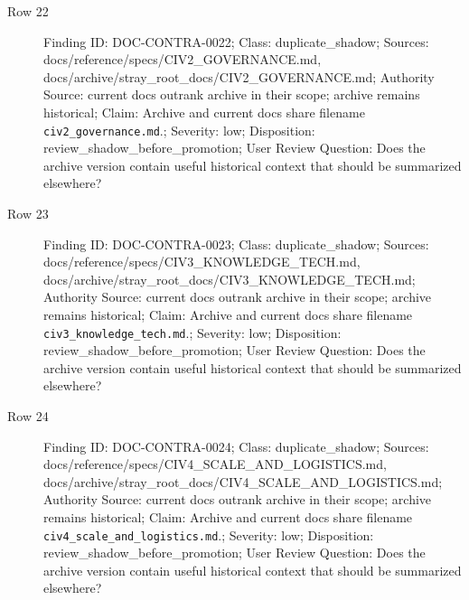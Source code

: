 \documentclass[10.5pt,a4paper,openany]{book}
\begin{document}
\begin{description}
\item[Row 22] Finding ID: DOC-\allowbreak{}CONTRA-\allowbreak{}0022; Class: duplicate\_\allowbreak{}shadow; Sources: docs/\allowbreak{}reference/\allowbreak{}specs/\allowbreak{}CIV2\_\allowbreak{}GOVERNANCE.\allowbreak{}md, docs/\allowbreak{}archive/\allowbreak{}stray\_\allowbreak{}root\_\allowbreak{}docs/\allowbreak{}CIV2\_\allowbreak{}GOVERNANCE.\allowbreak{}md; Authority Source: current docs outrank archive in their scope; archive remains historical; Claim: Archive and current docs share filename \texttt{civ2\_\allowbreak{}governance.\allowbreak{}md}.\allowbreak{}; Severity: low; Disposition: review\_\allowbreak{}shadow\_\allowbreak{}before\_\allowbreak{}promotion; User Review Question: Does the archive version contain useful historical context that should be summarized elsewhere?
\item[Row 23] Finding ID: DOC-\allowbreak{}CONTRA-\allowbreak{}0023; Class: duplicate\_\allowbreak{}shadow; Sources: docs/\allowbreak{}reference/\allowbreak{}specs/\allowbreak{}CIV3\_\allowbreak{}KNOWLEDGE\_\allowbreak{}TECH.\allowbreak{}md, docs/\allowbreak{}archive/\allowbreak{}stray\_\allowbreak{}root\_\allowbreak{}docs/\allowbreak{}CIV3\_\allowbreak{}KNOWLEDGE\_\allowbreak{}TECH.\allowbreak{}md; Authority Source: current docs outrank archive in their scope; archive remains historical; Claim: Archive and current docs share filename \texttt{civ3\_\allowbreak{}knowledge\_\allowbreak{}tech.\allowbreak{}md}.\allowbreak{}; Severity: low; Disposition: review\_\allowbreak{}shadow\_\allowbreak{}before\_\allowbreak{}promotion; User Review Question: Does the archive version contain useful historical context that should be summarized elsewhere?
\item[Row 24] Finding ID: DOC-\allowbreak{}CONTRA-\allowbreak{}0024; Class: duplicate\_\allowbreak{}shadow; Sources: docs/\allowbreak{}reference/\allowbreak{}specs/\allowbreak{}CIV4\_\allowbreak{}SCALE\_\allowbreak{}AND\_\allowbreak{}LOGISTICS.\allowbreak{}md, docs/\allowbreak{}archive/\allowbreak{}stray\_\allowbreak{}root\_\allowbreak{}docs/\allowbreak{}CIV4\_\allowbreak{}SCALE\_\allowbreak{}AND\_\allowbreak{}LOGISTICS.\allowbreak{}md; Authority Source: current docs outrank archive in their scope; archive remains historical; Claim: Archive and current docs share filename \texttt{civ4\_\allowbreak{}scale\_\allowbreak{}and\_\allowbreak{}logistics.\allowbreak{}md}.\allowbreak{}; Severity: low; Disposition: review\_\allowbreak{}shadow\_\allowbreak{}before\_\allowbreak{}promotion; User Review Question: Does the archive version contain useful historical context that should be summarized elsewhere?

\end{description}
\end{document}
